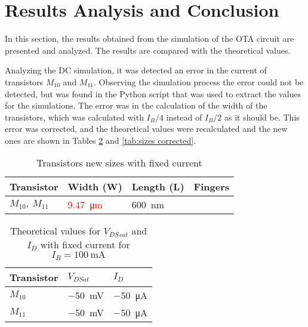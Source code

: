 \section{Results Analysis and Conclusion}

In this section, the results obtained from the simulation of the OTA circuit are presented and analyzed. The results are compared with the theoretical values.

Analyzing the DC simulation, it was detected an error in the current of transistors $M_{10}$ and $M_{11}$. Observing the simulation process the error could not be detected, but was found in the Python script that was used to extract the values for the simulations. The error was in the calculation of the width of the transistors, which was calculated with $I_B/4$ instead of $I_B/2$ as it should be. This error was corrected, and the theoretical values were recalculated and the new ones are shown in Tables \ref{tab:DC-corrected} and \ref{tab:sizes corrected}.

\begin{table}[H]
    \centering
    \caption{Transistors new sizes with fixed current}
    \begin{tabularx}{\textwidth}{>{\centering\arraybackslash}X >{\centering\arraybackslash}X >{\centering\arraybackslash} X >{\centering\arraybackslash}X}
        \toprule
        \textbf{Transistor} & \textbf{Width (W)} & \textbf{Length (L)} & \textbf{Fingers}\\
        \midrule
        $M_{10}, \ M_{11}$ & \textcolor{red}{\SI{9.47}{\micro\meter} } & \SI{600}{\nano\meter} & 18\\
        \bottomrule
    \end{tabularx}
    \label{tab:WL-teo-fix}
\end{table}

\begin{table}[H]
    \centering
    \caption{Theoretical values for $V_{DSsat}$ and $I_D$ with fixed current for $I_B = \SI{100}{\milli\ampere}$ }
    \begin{tabularx}{\textwidth}{>{\centering\arraybackslash}X >{\centering\arraybackslash}X >{\centering\arraybackslash}X}
        \toprule
        \textbf{Transistor} & \textbf{$V_{DSat}$} & \textbf{$I_D$}\\
        \midrule
        $M_{10}$ & \SI{-50}{\milli\volt} & \SI{-50}{\micro\ampere}\\
        \midrule
        $M_{11}$ & \SI{-50}{\milli\volt} & \SI{-50}{\micro\ampere}\\
        \bottomrule
    \end{tabularx}
    \label{tab:DC-corrected}
\end{table}

